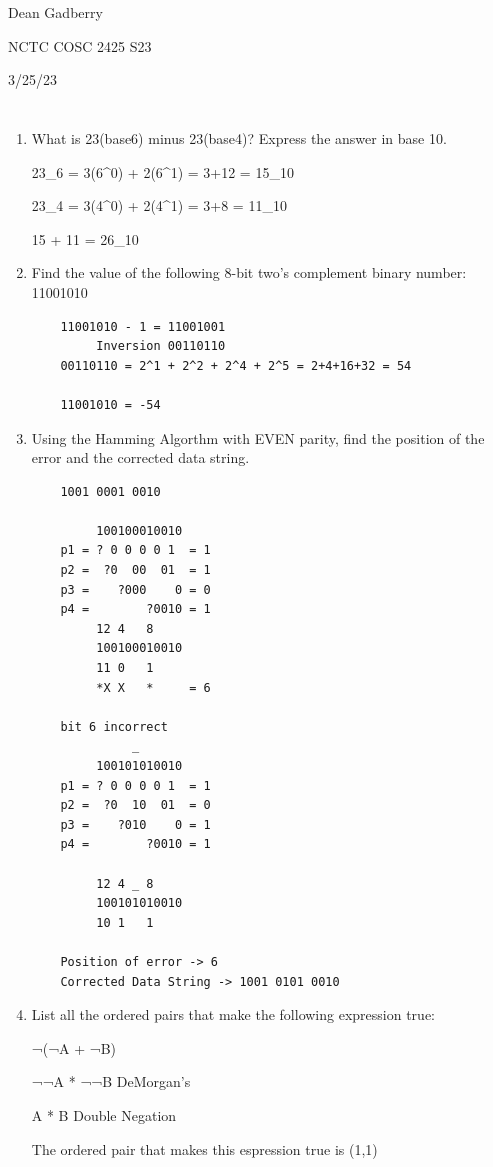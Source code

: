 \documentclass[12pt,a4paper,english]{article}
\begin{document}
Dean Gadberry

NCTC COSC 2425 S23

3/25/23
\section*{}
\begin{enumerate}
\item What is 23(base6) minus 23(base4)? Express the answer in base 10.

23_6 = 3(6^0) + 2(6^1) = 3+12 = 15_{10}
    
23_4 = 3(4^0) + 2(4^1) = 3+8 = 11_{10}

15 + 11 = 26_{10}
 
\item  Find the value of the following 8-bit two's complement binary number:
    11001010
\begin{lstlisting}
    11001010 - 1 = 11001001
         Inversion 00110110
    00110110 = 2^1 + 2^2 + 2^4 + 2^5 = 2+4+16+32 = 54

    11001010 = -54
\end{lstlisting}
\item  Using the Hamming Algorthm with EVEN parity, find the position of the error and the corrected data string.
    
\begin{lstlisting}
    1001 0001 0010

         100100010010
    p1 = ? 0 0 0 0 1  = 1
    p2 =  ?0  00  01  = 1
    p3 =    ?000    0 = 0
    p4 =        ?0010 = 1
         12 4   8
         100100010010
         11 0   1     
         *X X   *     = 6

    bit 6 incorrect
              _
         100101010010
    p1 = ? 0 0 0 0 1  = 1
    p2 =  ?0  10  01  = 0
    p3 =    ?010    0 = 1
    p4 =        ?0010 = 1

         12 4 _ 8
         100101010010
         10 1   1

    Position of error -> 6
    Corrected Data String -> 1001 0101 0010
      \end{lstlisting}

\item List all the ordered pairs that make the following expression true:

   ¬(¬A + ¬B)

    ¬¬A * ¬¬B       DeMorgan's 

    A * B       Double Negation

    The ordered pair that makes this espression true is 
        (1,1)


\end{enumerate}
\end{document}
